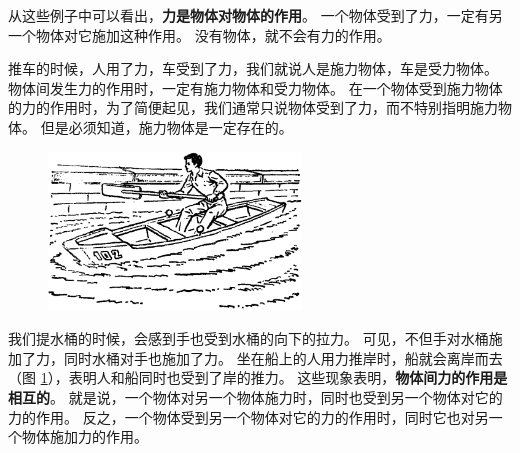 从这些例子中可以看出，\textbf{力是物体对物体的作用}。
一个物体受到了力，一定有另一个物体对它施加这种作用。
没有物体，就不会有力的作用。

推车的时候，人用了力，车受到了力，我们就说人是施力物体，车是受力物体。
物体间发生力的作用时，一定有施力物体和受力物体。
在一个物体受到施力物体的力的作用时，为了简便起见，我们通常只说物体受到了力，而不特别指明施力物体。
但是必须知道，施力物体是一定存在的。

\begin{figure}[htbp]
    \centering
    \includegraphics[width=0.6\textwidth]{../pic/czwl1-ch2-3}
    \caption{}\label{fig:2-3}
\end{figure}

我们提水桶的时候，会感到手也受到水桶的向下的拉力。
可见，不但手对水桶施加了力，同时水桶对手也施加了力。
坐在船上的人用力推岸时，船就会离岸而去（图 \ref{fig:2-3}），表明人和船同时也受到了岸的推力。
这些现象表明，\textbf{物体间力的作用是相互的}。
就是说，一个物体对另一个物体施力时，同时也受到另一个物体对它的力的作用。
反之，一个物体受到另一个物体对它的力的作用时，同时它也对另一个物体施加力的作用。


